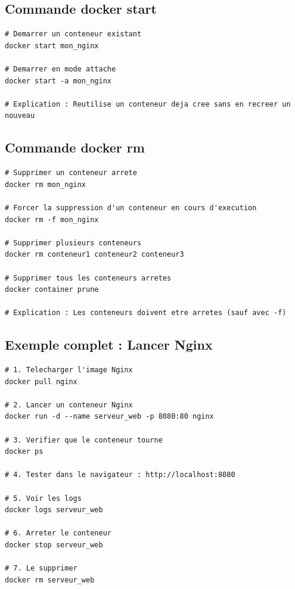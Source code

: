 \documentclass[a4paper,12pt]{article}
\begin{document}
\subsection{Commande docker start}
\begin{lstlisting}[caption=Demarrer un conteneur arrete]
# Demarrer un conteneur existant
docker start mon_nginx

# Demarrer en mode attache
docker start -a mon_nginx

# Explication : Reutilise un conteneur deja cree sans en recreer un nouveau
\end{lstlisting}

\subsection{Commande docker rm}
\begin{lstlisting}[caption=Supprimer des conteneurs]
# Supprimer un conteneur arrete
docker rm mon_nginx

# Forcer la suppression d'un conteneur en cours d'execution
docker rm -f mon_nginx

# Supprimer plusieurs conteneurs
docker rm conteneur1 conteneur2 conteneur3

# Supprimer tous les conteneurs arretes
docker container prune

# Explication : Les conteneurs doivent etre arretes (sauf avec -f)
\end{lstlisting}

\subsection{Exemple complet : Lancer Nginx}
\begin{lstlisting}[caption=Lancer un serveur web Nginx]
# 1. Telecharger l'image Nginx
docker pull nginx

# 2. Lancer un conteneur Nginx
docker run -d --name serveur_web -p 8080:80 nginx

# 3. Verifier que le conteneur tourne
docker ps

# 4. Tester dans le navigateur : http://localhost:8080

# 5. Voir les logs
docker logs serveur_web

# 6. Arreter le conteneur
docker stop serveur_web

# 7. Le supprimer
docker rm serveur_web
\end{lstlisting}

\end{document}
